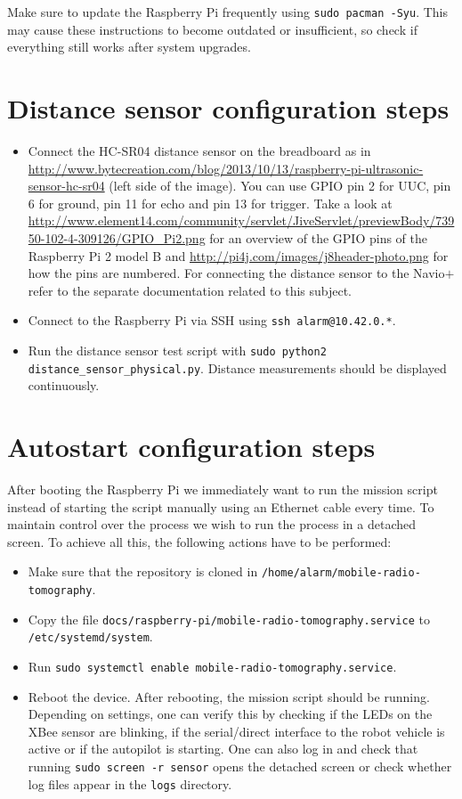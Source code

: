 \documentclass{article}
\newcommand{\navio}{Navio$\stackrel{}{+}$}
\begin{document}
Make sure to update the Raspberry Pi frequently using {\tt sudo pacman -Syu}. 
This may cause these instructions to become outdated or insufficient, so check 
if everything still works after system upgrades.

\section{Distance sensor configuration steps}
\begin{itemize}
    \item Connect the HC-SR04 distance sensor on the breadboard as in
          \url{http://www.bytecreation.com/blog/2013/10/13/raspberry-pi-ultrasonic-sensor-hc-sr04}
          (left side of the image). You can use GPIO pin 2 for UUC, pin 6 for
          ground, pin 11 for echo and pin 13 for trigger. Take a look at
          \url{http://www.element14.com/community/servlet/JiveServlet/previewBody/73950-102-4-309126/GPIO_Pi2.png}
          for an overview of the GPIO pins of the Raspberry Pi 2 model B and
          \url{http://pi4j.com/images/j8header-photo.png} for how the pins are
          numbered. For connecting the distance sensor to the \navio{} refer to 
          the separate documentation related to this subject.
    \item Connect to the Raspberry Pi via SSH using {\tt ssh alarm@10.42.0.*}.
    \item Run the distance sensor test script with {\tt sudo python2 
          distance\_sensor\_physical.py}. Distance measurements should be 
          displayed continuously.
\end{itemize}

\section{Autostart configuration steps}
After booting the Raspberry Pi we immediately want to run the mission script 
instead of starting the script manually using an Ethernet cable every time. To 
maintain control over the process we wish to run the process in a detached 
screen. To achieve all this, the following actions have to be performed:

\begin{itemize}
    \item Make sure that the repository is cloned in
          {\tt /home/alarm/mobile-radio-tomography}.
    \item Copy the file {\tt docs/raspberry-pi/mobile-radio-tomography.service} 
          to {\tt /etc/systemd/system}.
    \item Run {\tt sudo systemctl enable mobile-radio-tomography.service}.
    \item Reboot the device. After rebooting, the mission script should be 
          running. Depending on settings, one can verify this by checking if 
          the LEDs on the XBee sensor are blinking, if the serial/direct 
          interface to the robot vehicle is active or if the autopilot is 
          starting. One can also log in and check that running {\tt sudo screen 
          -r sensor} opens the detached screen or check whether log files 
          appear in the {\tt logs} directory.
\end{itemize}
\end{document}
